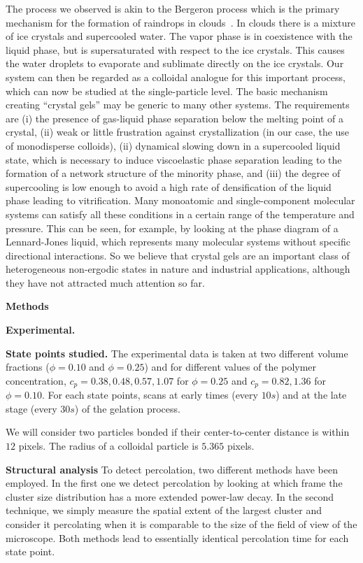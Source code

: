 \documentclass[twocolumn,showpacs,amsmath,amssymb,pre,superscriptaddress]{revtex4}
\begin{document}
The process we observed is akin to the Bergeron process which is the primary mechanism for the formation of raindrops in clouds~\cite{glickman2000glossary}.
In clouds there is a mixture of ice crystals and supercooled water. The vapor phase is in coexistence with the liquid phase, but is supersaturated
with respect to the ice crystals. This causes the water droplets to evaporate and sublimate directly on the ice crystals. Our system can then
be regarded as a colloidal analogue for this important process, which can now be studied at the single-particle level.
The basic mechanism creating ``crystal gels'' may be generic to many other
systems. The requirements are (i) the presence of gas-liquid phase separation below the melting point of a crystal, (ii) 
weak or little frustration against crystallization (in our case, the use of monodisperse colloids), 
(ii) dynamical slowing down in a supercooled liquid state, which is necessary to induce viscoelastic phase separation leading to the formation 
of a network structure of the minority phase, and (iii) the degree of supercooling is low enough to avoid a high rate of densification of the liquid phase 
leading to vitrification.   
Many monoatomic and single-component molecular systems can satisfy all these conditions in a certain range of the temperature and pressure. 
This can be seen, for example, by looking at the phase diagram of a Lennard-Jones liquid, which represents many molecular systems 
without specific directional interactions. So we believe that crystal gels are an important class of heterogeneous non-ergodic states in nature 
and industrial applications, although they have not attracted much attention so far.  

\vspace{2cm}
\noindent
{\bf \large Methods}

\noindent
{\bf Experimental.}

\noindent
{\bf State points studied. }
The experimental data is taken at two different volume fractions ($\phi=0.10$ and $\phi=0.25$) and for different values
of the polymer concentration, $c_p=0.38,0.48,0.57,1.07$ for $\phi=0.25$ and $c_p=0.82,1.36$ for $\phi=0.10$.
For each state points, scans at early times (every $10s$) and at the late stage (every $30s$) of the gelation process.

We will consider two particles bonded if their center-to-center distance is within $12$ pixels. The radius of a colloidal
particle is $5.365$ pixels.

\noindent
{\bf Structural analysis}
To detect percolation, two different methods have been employed. In the first one we detect percolation
by looking at which frame the cluster size distribution has a more extended power-law decay. In the second technique,
we simply measure the spatial extent of the largest cluster and consider it percolating when it is comparable to the
size of the field of view of the microscope. Both methods lead to essentially identical percolation time for each state point.




\clearpage
\end{document}
